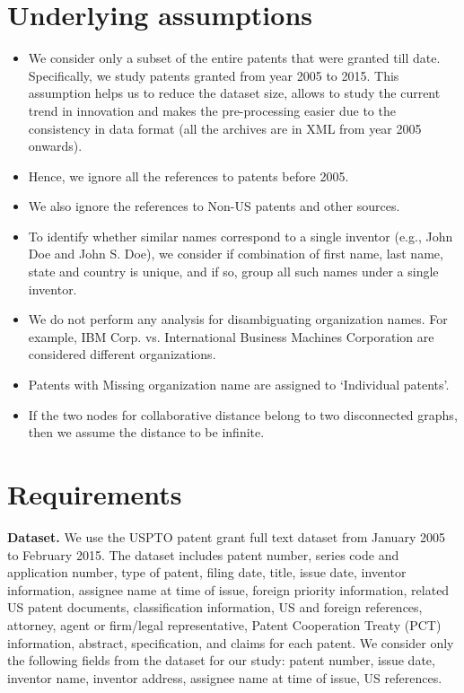 \documentclass[11pt]{article}
\renewcommand{\paragraph}{\vspace{3pt}\noindent\textbf}
\newcommand{\squish}{
  \setlength{\topsep}{0pt}
  \setlength{\itemsep}{0ex}
  \setlength{\parskip}{0pt}
}
\begin{document}
		
\section{Underlying assumptions} %
\begin{itemize}
\item We consider only a subset of the entire patents that were granted till date. Specifically, we study patents granted from year 2005 to 2015. This assumption helps us to reduce the dataset size, allows to study the current trend in innovation and makes the pre-processing easier due to the consistency in data format (all the archives are in XML from year 2005 onwards).
\item Hence, we ignore all the references to patents before 2005. 
\item We also ignore the references to Non-US patents and other sources.
\item To identify whether similar names correspond to a single inventor (e.g., John Doe and John S. Doe), we consider if combination of first name, last name, state and country is unique, and if so, group all such names under a single inventor. 
\item We do not perform any analysis for disambiguating organization names. For example, IBM Corp. vs. International Business Machines Corporation are considered different organizations.
\item Patents with Missing organization name  are assigned to `Individual patents'.
\item If the two nodes for collaborative distance belong to two disconnected graphs, then we assume the distance to be infinite.
\end{itemize}


\section{Requirements}

\paragraph {Dataset.} 
We use the USPTO patent grant full text dataset from January 2005 to February 2015. 
The dataset includes patent number, series code and application number, type of patent, filing date, title, issue date, inventor information, assignee name at time of issue, foreign priority information, related US patent documents, classification information, US and foreign references, attorney, agent or firm/legal representative, Patent Cooperation Treaty (PCT) information, abstract, specification, and claims for each patent. We consider only the following fields from the dataset for our study: patent number, issue date, inventor name, inventor address, assignee name at time of issue, US references.
\end{document}

